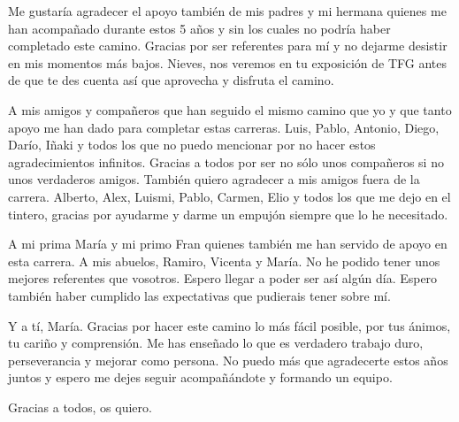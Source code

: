 Me gustaría agradecer el apoyo también de mis padres y mi hermana quienes me han acompañado durante estos 5 años y sin los cuales no podría haber completado este camino. Gracias por ser referentes para mí y no dejarme desistir en mis momentos más bajos. Nieves, nos veremos en tu exposición de TFG antes de que te des cuenta así que aprovecha y disfruta el camino.

A mis amigos y compañeros que han seguido el mismo camino que yo y que tanto apoyo me han dado para completar estas carreras. Luis, Pablo, Antonio, Diego, Darío, Iñaki y todos los que no puedo mencionar por no hacer estos agradecimientos infinitos. Gracias a todos por ser no sólo unos compañeros si no unos verdaderos amigos. También quiero agradecer a mis amigos fuera de la carrera. Alberto, Alex, Luismi, Pablo, Carmen, Elio y todos los que me dejo en el tintero, gracias por ayudarme y darme un empujón siempre que lo he necesitado.

A mi prima María y mi primo Fran quienes también me han servido de apoyo en esta carrera. A mis abuelos, Ramiro, Vicenta y María. No he podido tener unos mejores referentes que vosotros. Espero llegar a poder ser así algún día. Espero también haber cumplido las expectativas que pudierais tener sobre mí.

Y a tí, María. Gracias por hacer este camino lo más fácil posible, por tus ánimos, tu cariño y comprensión. Me has enseñado lo que es verdadero trabajo duro, perseverancia y mejorar como persona. No puedo más que agradecerte estos años juntos y espero me dejes seguir acompañándote y formando un equipo.

Gracias a todos, os quiero.

